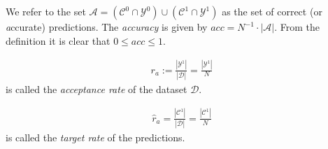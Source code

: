 We refer to the set $\mathcal{A} = (\mathcal{C}^0\cap\mathcal{Y}^0) \cup (\mathcal{C}^1\cap\mathcal{Y}^1)$
as the set of correct (or \emph{a}ccurate) predictions.
The \emph{accuracy} is given by $\mathit{acc} = N^{-1}\cdot\left|\mathcal{A}\right|$.
From the definition it is clear that $0\leq\mathit{acc} \leq 1$.

\begin{definition}
  \begin{align}
    r_a := \frac{\left|\mathcal{Y}^1\right|}{|\mathcal{D}|} = \frac{\left|\mathcal{Y}^1\right|}{N}
  \end{align}
  is called the \emph{acceptance rate} of the dataset $\mathcal{D}$.
\end{definition}

\begin{definition}
  \begin{align}
    \hat{r}_a = \frac{\left|\mathcal{C}^1\right|}{|\mathcal{D}|} = \frac{\left|\mathcal{C}^1\right|}{N}
  \end{align}
  is called the \emph{target rate} of the predictions.
\end{definition}

